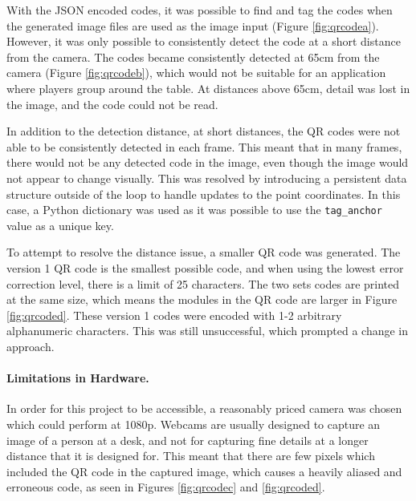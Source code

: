 \documentclass[12pt]{article}
\begin{document}
With the JSON encoded codes, it was possible to find and tag the codes when the generated image files are used as the image input (Figure \ref{fig:qrcodea}).
However, it was only possible to consistently detect the code at a short distance from the camera. 
The codes became consistently detected at 65cm from the camera (Figure \ref{fig:qrcodeb}), which would not be suitable for an application where players group around the table. 
At distances above 65cm, detail was lost in the image, and the code could not be read. 

In addition to the detection distance, at short distances, the QR codes were not able to be consistently detected in each frame. 
This meant that in many frames, there would not be any detected code in the image, even though the image would not appear to change visually. 
This was resolved by introducing a persistent data structure outside of the loop to handle updates to the point coordinates. 
In this case, a Python dictionary was used as it was possible to use the \texttt{tag\_anchor} value as a unique key.

To attempt to resolve the distance issue, a smaller QR code was generated. 
The version 1 QR code is the smallest possible code, and when using the lowest error correction level, there is a limit of 25 characters. 
The two sets codes are printed at the same size, which means the modules in the QR code are larger in Figure \ref{fig:qrcoded}. 
These version 1 codes were encoded with 1-2 arbitrary alphanumeric characters.
This was still unsuccessful, which prompted a change in approach. 

\paragraph{Limitations in Hardware.} In order for this project to be accessible, a reasonably priced camera was chosen which could perform at 1080p. 
Webcams are usually designed to capture an image of a person at a desk, and not for capturing fine details at a longer distance that it is designed for. 
This meant that there are few pixels which included the QR code in the captured image, which causes a heavily aliased and erroneous code, as seen in Figures \ref{fig:qrcodec} and \ref{fig:qrcoded}.
\end{document}
